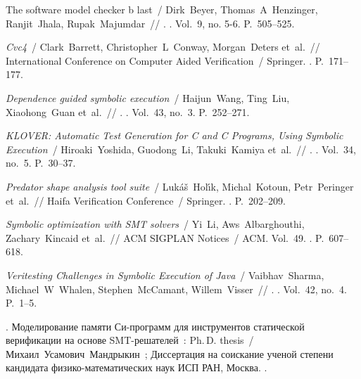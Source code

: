 \begin{thebibliography}{32}
The software model checker b last~/ Dirk~Beyer, Thomas~A~Henzinger,
  Ranjit~Jhala, Rupak~Majumdar~// . \BibDash
{}. \BibDash
\newblock Vol.~9, no. 5-6. \BibDash
\newblock P.~505--525.

\textit{Cvc4}~/ Clark~Barrett, Christopher~L~Conway, Morgan~Deters et~al.~//
  International Conference on Computer Aided Verification~/ Springer. \BibDash
{}. \BibDash
\newblock P.~171--177.

\textit{Dependence guided symbolic execution}~/ Haijun~Wang, Ting~Liu,
  Xiaohong~Guan et~al.~// .
  \BibDash
{}. \BibDash
\newblock Vol.~43, no.~3. \BibDash
\newblock P.~252--271.

\textit{KLOVER: Automatic Test Generation for C and C Programs, Using Symbolic
  Execution}~/ Hiroaki~Yoshida, Guodong~Li, Takuki~Kamiya et~al.~//
  . \BibDash
{}. \BibDash
\newblock Vol.~34, no.~5. \BibDash
\newblock P.~30--37.

\textit{Predator shape analysis tool suite}~/ Luk{\'a}{\v{s}}~Hol{\'\i}k,
  Michal~Kotoun, Petr~Peringer et~al.~// Haifa Verification Conference~/
  Springer. \BibDash
{}. \BibDash
\newblock P.~202--209.

\textit{Symbolic optimization with SMT solvers}~/ Yi~Li, Aws~Albarghouthi,
  Zachary~Kincaid et~al.~// ACM SIGPLAN Notices~/ ACM. \BibDash
\newblock Vol.~49. \BibDash
{}. \BibDash
\newblock P.~607--618.

\textit{Veritesting Challenges in Symbolic Execution of Java}~/ Vaibhav~Sharma,
  Michael~W~Whalen, Stephen~McCamant, Willem~Visser~// . \BibDash
{}. \BibDash
\newblock Vol.~42, no.~4. \BibDash
\newblock P.~1--5.

.
  Моделирование памяти Си-программ для
  инструментов статической верификации на
  основе SMT-решателей~: Ph.\,D. thesis~/
  Михаил~Усамович~Мандрыкин~; Диссертация
  на соискание ученой степени кандидата
  физико-математических наук ИСП РАН,
  Москва. \BibDash
{}.

\end{thebibliography}
